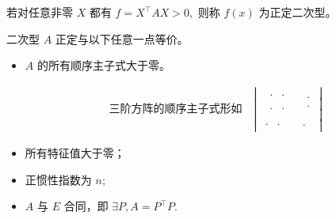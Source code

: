 

若对任意非零 $ X $ 都有 $ f = X^\top AX >0, $ 则称 $ f(x) $ 为正定二次型。


二次型 $ A $ 正定与以下任意一点等价。
\begin{itemize}
    \item $ A $ 的所有顺序主子式大于零。
    
    \begin{equation*}
        \begin{aligned}
            \textrm{三阶方阵的顺序主子式形如}\quad{}\left|
            \begin{array}{cc}
                \begin{array}{|c|}
                    \begin{array}{|c|c}
                        \cdot&\cdot
                    \end{array}\\
                    \begin{array}{cc}
                        \cdot&\cdot
                    \end{array}
                \end{array}&
                \begin{array}{c}
                    \cdot\\\cdot
                \end{array}\\ 
                \begin{array}{cc}
                    \cdot&\cdot
                \end{array}&\cdot
            \end{array}\right|
        \end{aligned}
    \end{equation*}
    \item 所有特征值大于零；
    \item 正惯性指数为 $ n; $ 
    \item $ A $ 与 $ E $ 合同，即 $ \exists P, A = P^\top P. $ 
\end{itemize}

